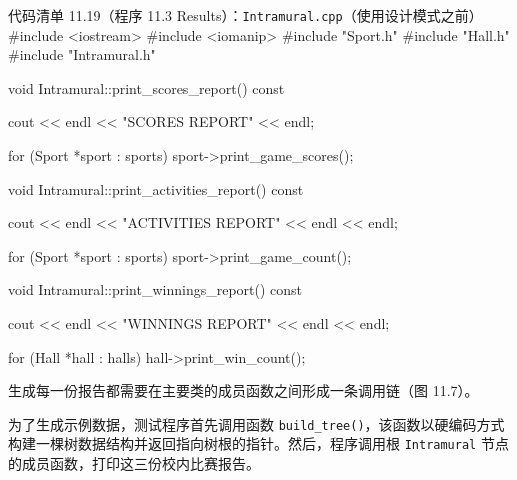\begin{codeboxt}{代码清单 11.19（程序 11.3 Results）：\texttt{Intramural.\allowbreak{}cpp}（使用设计模式之前）}
#include <iostream>
#include <iomanip>
#include "Sport.h"
#include "Hall.h"
#include "Intramural.h"

void Intramural::print_scores_report() const
{
    cout << endl << "SCORES REPORT" << endl;

    for (Sport *sport : sports) sport->print_game_scores();
}

void Intramural::print_activities_report() const
{
    cout << endl << "ACTIVITIES REPORT" << endl << endl;

    for (Sport *sport : sports) sport->print_game_count();
}

void Intramural::print_winnings_report() const
{
    cout << endl << "WINNINGS REPORT" << endl << endl;

    for (Hall *hall : halls) hall->print_win_count();
}
\end{codeboxt}

生成每一份报告都需要在主要类的成员函数之间形成一条调用链（图 11.7）。


为了生成示例数据，测试程序首先调用函数 \texttt{build\_\allowbreak{}tree(\allowbreak{})\allowbreak{}}，该函数以硬编码方式构建一棵树数据结构并返回指向树根的指针。然后，程序调用根 \texttt{Intramural} 节点的成员函数，打印这三份校内比赛报告。


